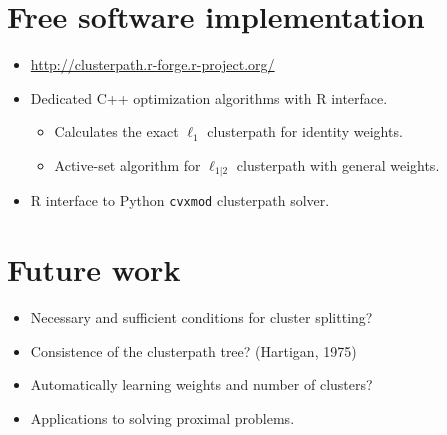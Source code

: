 \documentclass[]{posterDIGITEO}
\begin{document}
\begin{multicols}{2}
\section{Free software implementation}
\begin{itemize}
\item \url{http://clusterpath.r-forge.r-project.org/}
\item Dedicated C++ optimization algorithms with R interface.
  \begin{itemize} 
  \item Calculates the exact $\ell_1$ clusterpath for identity weights.
  \item Active-set algorithm for $\ell_{1|2}$ clusterpath with general
    weights.
  \end{itemize}
\item R interface to Python \texttt{cvxmod} clusterpath solver.
\end{itemize}

\section{Future work}
  \begin{itemize}
  \item Necessary and sufficient conditions for cluster splitting?
  \item Consistence of the clusterpath tree? (Hartigan, 1975)
  \item Automatically learning weights and number of clusters?
  \item Applications to solving proximal problems.
  \end{itemize}




\end{multicols}
\end{document}
